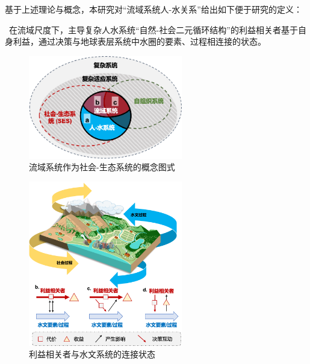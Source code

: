 基于上述理论与概念，本研究对“流域系统人-水关系”给出如下便于研究的定义：

{\kai~在流域尺度下，主导复杂人水系统“自然-社会二元循环结构”的利益相关者基于自身利益，通过决策与地球表层系统中水圈的要素、过程相连接的状态。}

\begin{figure}[htb] %
    \centering
    \includegraphics[width=0.6\textwidth]{img/ch2/ch2_concepts.png}
    \caption[流域系统作为社会-生态系统的概念图式]{流域系统作为社会-生态系统的概念图式}\label{ch2:fig:concepts}
\end{figure}


\begin{figure}[htb]
    \centering
    \includegraphics[width=0.6\textwidth]{img/ch2/ch2_interactions.png}
    \caption{利益相关者与水文系统的连接状态}\label{ch2:fig:interactions}
\end{figure}
